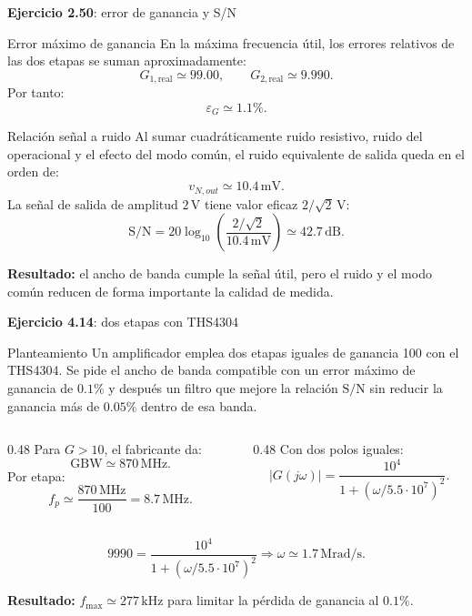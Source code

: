 \documentclass[aspectratio=169,9pt]{beamer}
\newcommand{\exercise}[1]{\textbf{Ejercicio #1}}
\newcommand{\result}[1]{\textbf{\color{eiTeal}Resultado:} #1}
\newcommand{\unit}[1]{\,\mathrm{#1}}
\newcommand{\SN}{\mathrm{S/N}}
\newcommand{\GBW}{\mathrm{GBW}}
\begin{document}
\begin{frame}[shrink=20]{\exercise{2.50}: error de ganancia y S/N}
  \begin{block}{Error máximo de ganancia}
    En la máxima frecuencia útil, los errores relativos de las dos etapas se suman aproximadamente:
    \[
      G_{1,\mathrm{real}}\simeq 99.00,\qquad
      G_{2,\mathrm{real}}\simeq 9.990.
    \]
    Por tanto:
    \[
      \varepsilon_G\simeq 1.1\%.
    \]
  \end{block}

  \begin{block}{Relación señal a ruido}
    Al sumar cuadráticamente ruido resistivo, ruido del operacional y el efecto del modo común, el ruido equivalente de salida queda en el orden de:
    \[
      v_{N,out}\simeq 10.4\unit{mV}.
    \]
    La señal de salida de amplitud \(2\unit{V}\) tiene valor eficaz \(2/\sqrt{2}\unit{V}\):
    \[
      \SN=20\log_{10}\left(\frac{2/\sqrt{2}}{10.4\unit{mV}}\right)\simeq 42.7\unit{dB}.
    \]
  \end{block}

  \result{el ancho de banda cumple la señal útil, pero el ruido y el modo común reducen de forma importante la calidad de medida.}
\end{frame}

\begin{frame}[shrink=8]{\exercise{4.14}: dos etapas con THS4304}
  \begin{block}{Planteamiento}
    Un amplificador emplea dos etapas iguales de ganancia 100 con el THS4304. Se pide el ancho de banda compatible con un error máximo de ganancia de \(0.1\%\) y después un filtro que mejore la relación \(\SN\) sin reducir la ganancia más de \(0.05\%\) dentro de esa banda.
  \end{block}

  \begin{columns}[T,onlytextwidth]
    \begin{column}{0.48\textwidth}
      Para \(G>10\), el fabricante da:
      \[
        \GBW\simeq 870\unit{MHz}.
      \]
      Por etapa:
      \[
        f_p\simeq \frac{870\unit{MHz}}{100}=8.7\unit{MHz}.
      \]
    \end{column}
    \begin{column}{0.48\textwidth}
      Con dos polos iguales:
      \[
        |G(j\omega)|=
        \frac{10^4}{1+\left(\omega/5.5\cdot10^7\right)^2}.
      \]
    \end{column}
  \end{columns}

  \[
    9990=\frac{10^4}{1+\left(\omega/5.5\cdot10^7\right)^2}
    \Rightarrow
    \omega\simeq 1.7\unit{Mrad/s}.
  \]

  \result{\(f_{\max}\simeq 277\unit{kHz}\) para limitar la pérdida de ganancia al \(0.1\%\).}
\end{frame}
\end{document}
